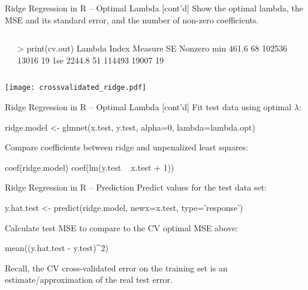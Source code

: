 \documentclass[ignorenonframetext,xcolor=x11names]{beamer}
\begin{document}
\begin{frame}[fragile]{Ridge Regression in R  -- Optimal Lambda \small [cont'd]}
\small
Show the optimal lambda, the MSE and its standard error, and the number of non-zero coefficients.
\begin{columns}
\begin{column}{.35\textwidth}
\end{column}
\begin{column}{.65\textwidth}
\begin{textcode}
> print(cv.out)
    Lambda Index Measure    SE Nonzero
min  461.6    68  102536 13016      19
1se 2244.8    51  114493 19007      19
\end{textcode}
\end{column}
\end{columns}
\texttt{[image: crossvalidated\_ridge.pdf]}
\end{frame}

\begin{frame}[fragile]{Ridge Regression in R -- Optimal Lambda \small [cont'd]}
\small
Fit test data using optimal $\lambda$:
\begin{Rcode}
ridge.model <- glmnet(x.test, y.test, 
                      alpha=0, lambda=lambda.opt)
\end{Rcode}
Compare coefficients between ridge and unpenalized least squares:
\begin{Rcode}
coef(ridge.model)
coef(lm(y.test ~ x.test + 1))
\end{Rcode}
\end{frame}

\begin{frame}[fragile]{Ridge Regression in R -- Prediction}
\small
Predict values for the test data set:
\begin{Rcode}
y.hat.test <- predict(ridge.model, newx=x.test, 
                                      type='response')
\end{Rcode}
Calculate test MSE to compare to the CV optimal MSE above:
\begin{Rcode}
mean((y.hat.test - y.test)^2)
\end{Rcode}
Recall, the CV cross-validated error on the training set is an estimate/approximation of the real test error.
\end{frame}
\end{document}
